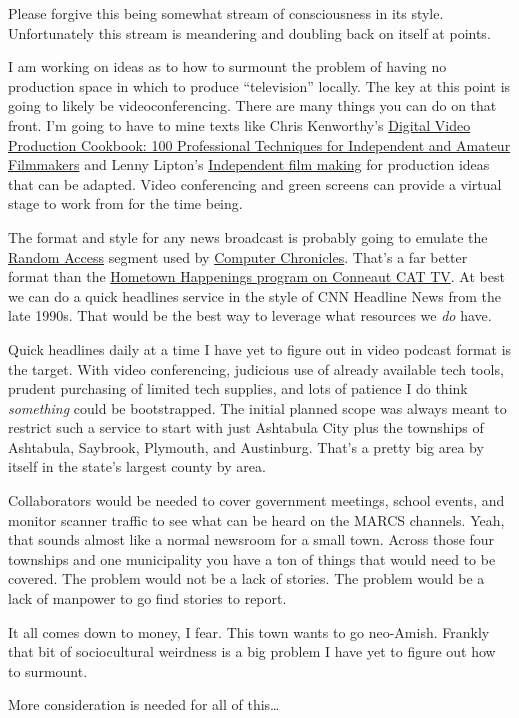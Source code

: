 Please forgive this being somewhat stream of consciousness in its style.
Unfortunately this stream is meandering and doubling back on itself at
points.

I am working on ideas as to how to surmount the problem of having no
production space in which to produce ``television'' locally. The key at
this point is going to likely be videoconferencing. There are many
things you can do on that front. I'm going to have to mine texts like
Chris Kenworthy's
\href{https://www.librarything.com/work/626712/book/187591453}{Digital
Video Production Cookbook: 100 Professional Techniques for Independent
and Amateur Filmmakers} and Lenny Lipton's
\href{https://www.librarything.com/work/531879/book/212302420}{Independent
film making} for production ideas that can be adapted. Video
conferencing and green screens can provide a virtual stage to work from
for the time being.

The format and style for any news broadcast is probably going to emulate
the \href{https://archive.org/details/randomaccess_2}{Random Access}
segment used by
\href{https://archive.org/details/computerchronicles}{Computer
Chronicles}. That's a far better format than the
\href{https://vimeo.com/792662413}{Hometown Happenings program on
Conneaut CAT TV}. At best we can do a quick headlines service in the
style of CNN Headline News from the late 1990s. That would be the best
way to leverage what resources we \emph{do} have.

Quick headlines daily at a time I have yet to figure out in video
podcast format is the target. With video conferencing, judicious use of
already available tech tools, prudent purchasing of limited tech
supplies, and lots of patience I do think \emph{something} could be
bootstrapped. The initial planned scope was always meant to restrict
such a service to start with just Ashtabula City plus the townships of
Ashtabula, Saybrook, Plymouth, and Austinburg. That's a pretty big area
by itself in the state's largest county by area.

Collaborators would be needed to cover government meetings, school
events, and monitor scanner traffic to see what can be heard on the
MARCS channels. Yeah, that sounds almost like a normal newsroom for a
small town. Across those four townships and one municipality you have a
ton of things that would need to be covered. The problem would not be a
lack of stories. The problem would be a lack of manpower to go find
stories to report.

It all comes down to money, I fear. This town wants to go neo-Amish.
Frankly that bit of sociocultural weirdness is a big problem I have yet
to figure out how to surmount.

More consideration is needed for all of this\ldots{}
